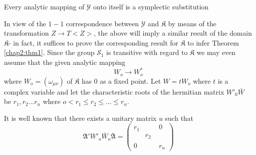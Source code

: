   \begin{thm}\label{chap2:thm1}%
 Every analytic mapping of $\mathscr{Y}$ onto itself is a
  symplectic substitution 
 \end{thm} 
 
 In view of the $1-1$ correspondence between $\mathscr{Y}$ and
 $\mathfrak{K}$ by means of the transformation $Z \to T < Z >$, the
 above will imply a similar result of the domain $\mathfrak{K}$- in
 fact, it suffices to prove the corresponding  result for
 $\mathfrak{K}$ to infer Theorem \ref{chap2:thm1}. Since the group
 $\mathcal{S}_1$ 
 is transitive with regard to $\mathfrak{K}$ we may even assume that
 the given analytic mapping   
 \begin{equation*}
W_o \to W^*_o \tag{30}\label{eq30} 
  \end{equation*} 
  where $W_o = (\omega_{\mu \nu})$ of $\mathfrak{K}$ has 0 as a
  fixed point. Let $W = tW_o$ where $t$ is a complex variable and let
  the characteristic roots of the hermitian matrix $W'_0 \bar{W}$ be
  $r_1, r_2 \dots r_n$ where $o < r_1 \le r_2 \le \dots \le r_n$.  


  It is well known that there exists a unitary matrix $u$ such that 
$$
\mathfrak{A}'W'_o \bar{W}_o \bar{\mathfrak{A}} = \begin{pmatrix}  r_1
  & & 0 \\ &  r_{2_{..}}  & \\ 0 &  & r_n\end{pmatrix} 
$$\pageoriginale  

